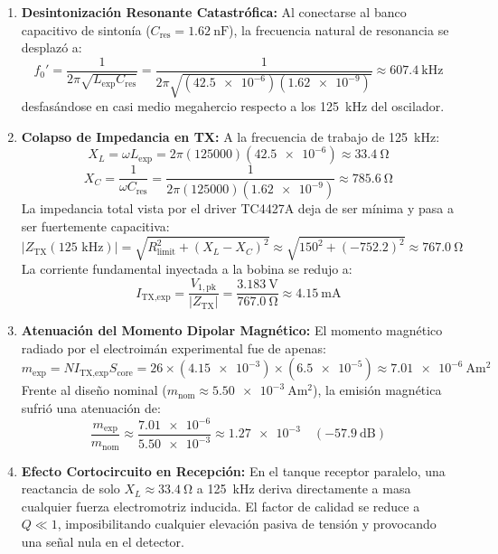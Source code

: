 \begin{enumerate}
    Es decir, **23.5 veces inferior** al valor de diseño nominal ($L_{\text{nom}} = \SI{1000}{\micro\henry}$).
    \item \textbf{Desintonización Resonante Catastrófica:} Al conectarse al banco capacitivo de sintonía ($C_{\text{res}} = \SI{1.62}{\nano\farad}$), la frecuencia natural de resonancia se desplazó a:
    \begin{equation}
        f_0' = \frac{1}{2\pi \sqrt{L_{\text{exp}} C_{\text{res}}}} = \frac{1}{2\pi \sqrt{(\num{42.5e-6})(\num{1.62e-9})}} \approx \SI{607.4}{\kilo\hertz}
    \end{equation}
    desfasándose en casi medio megahercio respecto a los \SI{125}{\kilo\hertz} del oscilador.
    \item \textbf{Colapso de Impedancia en TX:} A la frecuencia de trabajo de \SI{125}{\kilo\hertz}:
    \begin{equation}
        X_L = \omega L_{\text{exp}} = 2\pi (125000)(\num{42.5e-6}) \approx \SI{33.4}{\ohm}
    \end{equation}
    \begin{equation}
        X_C = \frac{1}{\omega C_{\text{res}}} = \frac{1}{2\pi (125000)(\num{1.62e-9})} \approx \SI{785.6}{\ohm}
    \end{equation}
    La impedancia total vista por el driver TC4427A deja de ser mínima y pasa a ser fuertemente capacitiva:
    \begin{equation}
        |Z_{\text{TX}}(125\text{ kHz})| = \sqrt{R_{\text{limit}}^2 + (X_L - X_C)^2} \approx \sqrt{150^2 + (-752.2)^2} \approx \SI{767.0}{\ohm}
    \end{equation}
    La corriente fundamental inyectada a la bobina se redujo a:
    \begin{equation}
        I_{\text{TX,exp}} = \frac{V_{1,\text{pk}}}{|Z_{\text{TX}}|} = \frac{\SI{3.183}{\volt}}{\SI{767.0}{\ohm}} \approx \SI{4.15}{\milli\ampere}
    \end{equation}
    \item \textbf{Atenuación del Momento Dipolar Magnético:} El momento magnético radiado por el electroimán experimental fue de apenas:
    \begin{equation}
        m_{\text{exp}} = N I_{\text{TX,exp}} S_{\text{core}} = 26 \times (\num{4.15e-3}) \times (\num{6.5e-5}) \approx \SI{7.01e-6}{\ampere\meter\squared}
    \end{equation}
    Frente al diseño nominal ($m_{\text{nom}} \approx \SI{5.50e-3}{\ampere\meter\squared}$), la emisión magnética sufrió una atenuación de:
    \begin{equation}
        \frac{m_{\text{exp}}}{m_{\text{nom}}} \approx \frac{\num{7.01e-6}}{\num{5.50e-3}} \approx \num{1.27e-3} \quad (\SI{-57.9}{\deci\bel})
    \end{equation}
    \item \textbf{Efecto Cortocircuito en Recepción:} En el tanque receptor paralelo, una reactancia de solo $X_L \approx \SI{33.4}{\ohm}$ a \SI{125}{\kilo\hertz} deriva directamente a masa cualquier fuerza electromotriz inducida. El factor de calidad se reduce a $Q \ll 1$, imposibilitando cualquier elevación pasiva de tensión y provocando una señal nula en el detector.
\end{enumerate}


